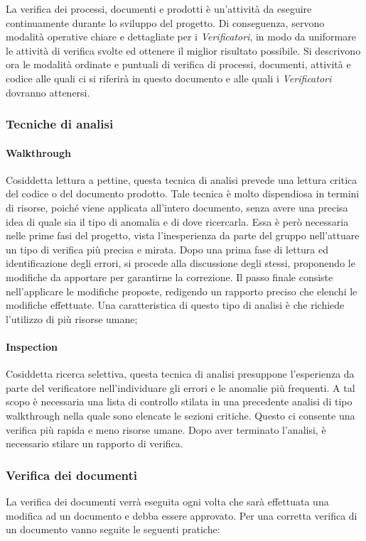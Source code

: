 La verifica dei processi, documenti e prodotti è un'attività da eseguire continuamente durante lo sviluppo del progetto. Di conseguenza, servono modalità operative chiare e dettagliate per i \textit{Verificatori}, in modo da uniformare le attività di verifica svolte ed ottenere il miglior risultato possibile. Si descrivono ora le modalità ordinate e puntuali di verifica di processi, documenti, attività e codice alle quali ci si riferirà in questo documento e alle quali i \textit{Verificatori} dovranno attenersi.

\subsubsection{Tecniche di analisi}
\paragraph{Walkthrough}
Cosiddetta lettura a pettine, questa tecnica di analisi prevede una lettura critica del codice o del documento prodotto. Tale tecnica è molto dispendiosa in termini di risorse, poiché viene applicata all'intero documento, senza avere una precisa idea di quale sia il tipo di anomalia e di dove ricercarla. Essa è però necessaria nelle prime fasi del progetto, vista l'inesperienza da parte del gruppo nell'attuare un tipo di verifica più precisa e mirata. Dopo una prima fase di lettura ed identificazione degli errori, si procede alla discussione degli stessi, proponendo le modifiche da apportare per garantirne la correzione. Il passo finale consiste nell'applicare le modifiche proposte, redigendo un rapporto preciso che elenchi le modifiche effettuate. Una caratteristica di questo tipo di analisi è che richiede l'utilizzo di più risorse umane;
\paragraph{Inspection}
Cosiddetta ricerca selettiva, questa tecnica di analisi presuppone l'esperienza da parte del verificatore nell'individuare gli errori e le anomalie più frequenti. A tal scopo è necessaria una lista di controllo stilata in una precedente analisi di tipo walkthrough nella quale sono elencate le sezioni critiche. Questo ci consente una verifica più rapida e meno risorse umane. Dopo aver terminato l'analisi, è necessario stilare un rapporto di verifica.

\subsubsection{Verifica dei documenti}
La verifica dei documenti verrà eseguita ogni volta che sarà effettuata una modifica ad un documento e debba essere approvato.
Per una corretta verifica di un documento vanno seguite le seguenti pratiche:

